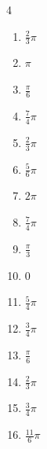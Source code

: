 \begin{multicols}{4}
\begin{enumerate}
  \item $\displaystyle \frac{2}{3}\pi$

  \item $\displaystyle \pi$

  \item $\displaystyle \frac{\pi}{6}$

  \item $\displaystyle \frac{7}{4}\pi$

  \item $\displaystyle \frac{2}{3}\pi$

  \item $\displaystyle \frac{5}{6}\pi$

\columnbreak %

  \item $\displaystyle 2\pi$

  \item $\displaystyle \frac{7}{4}\pi$

  \item $\displaystyle \frac{\pi}{3}$

  \item $\displaystyle 0$

  \item $\displaystyle \frac{5}{4}\pi$

  \item $\displaystyle \frac{3}{4}\pi$

  \item $\displaystyle \frac{\pi}{6}$

  \item $\displaystyle \frac{2}{3}\pi$

  \item $\displaystyle \frac{3}{4}\pi$

  \item $\displaystyle \frac{11}{6}\pi$


\end{enumerate}
\end{multicols}
